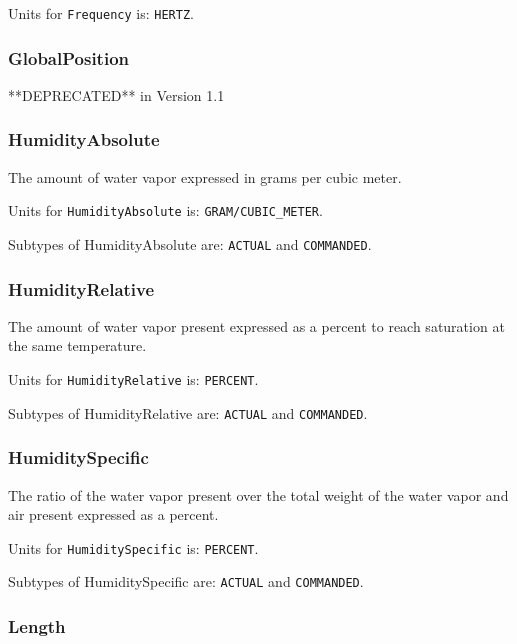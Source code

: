Units for \texttt{Frequency} is: \texttt{HERTZ}.

\FloatBarrier

\subsubsection{GlobalPosition}
  \label{sec:GlobalPosition}


**DEPRECATED** in Version 1.1

\FloatBarrier

\subsubsection{HumidityAbsolute}
  \label{sec:HumidityAbsolute}


The amount of water vapor expressed in grams per cubic meter.


Units for \texttt{HumidityAbsolute} is: \texttt{GRAM/CUBIC_METER}.


Subtypes of HumidityAbsolute are: \texttt{ACTUAL} and \texttt{COMMANDED}. 
\FloatBarrier

\subsubsection{HumidityRelative}
  \label{sec:HumidityRelative}


The amount of water vapor present expressed as a percent to reach saturation at the same temperature.


Units for \texttt{HumidityRelative} is: \texttt{PERCENT}.


Subtypes of HumidityRelative are: \texttt{ACTUAL} and \texttt{COMMANDED}. 
\FloatBarrier

\subsubsection{HumiditySpecific}
  \label{sec:HumiditySpecific}


The ratio of the water vapor present over the total weight of the water vapor and air present expressed as a percent.



Units for \texttt{HumiditySpecific} is: \texttt{PERCENT}.


Subtypes of HumiditySpecific are: \texttt{ACTUAL} and \texttt{COMMANDED}. 
\FloatBarrier

\subsubsection{Length}
  \label{sec:Length}


